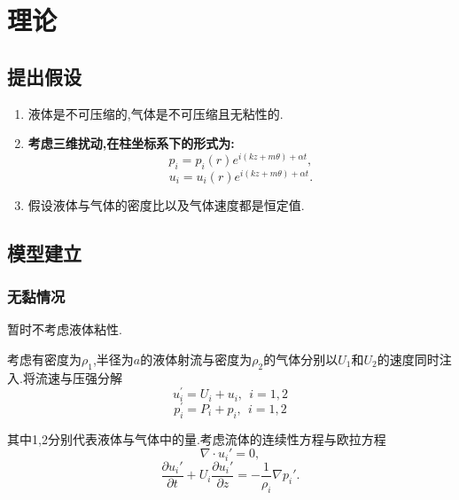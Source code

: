 \documentclass[UTF8]{gapd}
\begin{document}
\section{理论}
\label{sec:Theory}
\subsection{提出假设}

\begin{enumerate}
	\item 液体是不可压缩的,气体是不可压缩且无粘性的.
	\item \textbf{考虑三维扰动,在柱坐标系下的形式为:}
	\begin{equation}
		p_{i}=p_{i}(r) e^{i(k z+m \theta)+\alpha t}, 
	\end{equation}
	\begin{equation}
		u_{i}=u_{i}(r) e^{i(k z+m \theta)+\alpha t}.
	\end{equation}
	\item 假设液体与气体的密度比以及气体速度都是恒定值.
\end{enumerate}

\subsection{模型建立}
\subsubsection{无黏情况}
暂时不考虑液体粘性.

考虑有密度为$\rho_{1}$,半径为$a$的液体射流与密度为$\rho_{2}$的气体分别以$U_1$和$U_2$的速度同时注入.将流速与压强分解
\begin{equation}
	u_{i}^{\prime}=U_{i}+u_{i},~~i=1,2 
\end{equation}
\begin{equation}
	p_{i}^{\prime}=P_{i}+p_{i},~~i=1,2
\end{equation}

其中1,2分别代表液体与气体中的量.考虑流体的连续性方程与欧拉方程
\begin{equation}
\nabla \cdot u_i'=0,
\end{equation}
\begin{equation}
\frac{\partial u_i'}{\partial t}+U_i\frac{\partial u_i'}{\partial z}=-\frac{1}{\rho _i}\nabla p_i'.
\end{equation}
\end{document}
